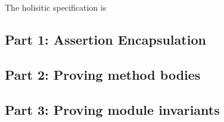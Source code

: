 The holisitic specification is



\subsection{Part 1: Assertion Encapsulation}
\label{s:BA-encap}


\subsection{Part 2: Proving method bodies}
\label{s:BA-bodies}

\subsection{Part 3: Proving module invariants}
\label{s:BA-modules}
